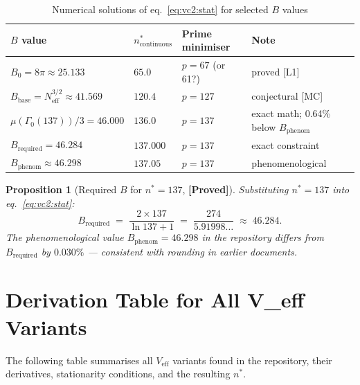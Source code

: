 \documentclass[12pt,a4paper]{article}
\newtheorem{proposition}[theorem]{Proposition}
\theoremstyle{definition}
\theoremstyle{remark}
\newcommand{\PROVED}{\textbf{[Proved]}}
\begin{document}
\begin{table}[h]
\centering
\caption{Numerical solutions of eq.~\eqref{eq:vc2:stat} for selected $B$ values}
\label{tab:vc2:nstar}
\begin{tabular}{llll}
\toprule
$B$ value & $n^*_{\mathrm{continuous}}$ & Prime minimiser & Note \\
\midrule
$B_0 = 8\pi \approx 25.133$ & $65.0$ & $p = 67$ (or 61?) & proved [L1] \\
$B_{\mathrm{base}} = N_{\mathrm{eff}}^{3/2} \approx 41.569$ & $120.4$ & $p = 127$ & conjectural [MC] \\
$\mu(\Gamma_0(137))/3 = 46.000$ & $136.0$ & $p = 137$ & exact math; 0.64\% below $B_{\mathrm{phenom}}$ \\
$B_{\mathrm{required}} = 46.284$ & $137.000$ & $p = 137$ & exact constraint \\
$B_{\mathrm{phenom}} \approx 46.298$ & $137.05$ & $p = 137$ & phenomenological \\
\bottomrule
\end{tabular}
\end{table}

\begin{proposition}[Required $B$ for $n^* = 137$, \PROVED]
\label{prop:vc2:Breq}
Substituting $n^* = 137$ into eq.~\eqref{eq:vc2:stat}:
\begin{equation}
  B_{\mathrm{required}}
  \;=\;
  \frac{2 \times 137}{\ln 137 + 1}
  \;=\;
  \frac{274}{5.91998\ldots}
  \;\approx\; 46.284.
  \label{eq:vc2:Breq}
\end{equation}
The phenomenological value $B_{\mathrm{phenom}} = 46.298$ in the repository
differs from $B_{\mathrm{required}}$ by $0.030\%$ — consistent with rounding in
earlier documents.
\end{proposition}

\section{Derivation Table for All V_eff Variants}
\label{sec:vc2:variants}

The following table summarises all $V_{\mathrm{eff}}$ variants found in the
repository, their derivatives, stationarity conditions, and the resulting $n^*$.
\end{document}
